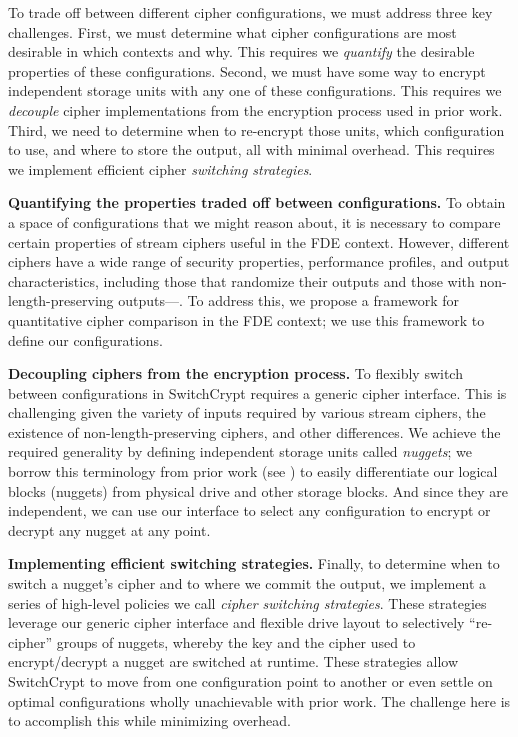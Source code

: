 To trade off between different cipher configurations, we must address three key
challenges. First, we must determine what cipher configurations are most
desirable in which contexts and why. This requires we \emph{quantify} the
desirable properties of these configurations. Second, we must have some way to
encrypt independent storage units with any one of these configurations. This
requires we \emph{decouple} cipher implementations from the encryption process
used in prior work. Third, we need to determine when to re-encrypt those units,
which configuration to use, and where to store the output, all with minimal
overhead. This requires we implement efficient cipher \emph{switching
strategies}.

\textbf{Quantifying the properties traded off between configurations.} To obtain
a space of configurations that we might reason about, it is necessary to compare
certain properties of stream ciphers useful in the FDE context. However,
different ciphers have a wide range of security properties, performance
profiles, and output characteristics, including those that randomize their
outputs and those with non-length-preserving outputs---. To address this, we propose a framework for
quantitative cipher comparison in the FDE context; we use this framework to
define our configurations.

\textbf{Decoupling ciphers from the encryption process.} To flexibly switch
between configurations in SwitchCrypt requires a generic cipher interface. This
is challenging given the variety of inputs required by various stream ciphers,
the existence of non-length-preserving ciphers, and other differences. We
achieve the required generality by defining independent storage units called
\emph{nuggets}; we borrow this terminology from prior work (see
\cite{StrongBox}) to easily differentiate our logical blocks (nuggets) from
physical drive and other storage blocks. And since they are independent, we can
use our interface to select any configuration to encrypt or decrypt any nugget
at any point.

\textbf{Implementing efficient switching strategies.} Finally, to determine when
to switch a nugget's cipher and to where we commit the output, we implement a
series of high-level policies we call \textit{cipher switching strategies}.
These strategies leverage our generic cipher interface and flexible drive layout
to selectively ``re-cipher'' groups of nuggets, whereby the key and the cipher
used to encrypt/decrypt a nugget are switched at runtime. These strategies allow
SwitchCrypt to move from one configuration point to another or even settle on
optimal configurations wholly unachievable with prior work. The challenge here
is to accomplish this while minimizing overhead.




